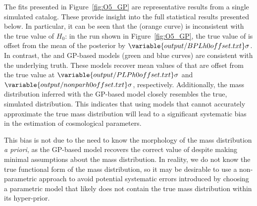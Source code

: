 \documentclass[preprint2,linenumbers]{aastex631}
\begin{document}
The fits presented in Figure~\ref{fig:O5_GP} are representative results from a single simulated catalog.
These provide insight into the full statistical results presented below.
In particular, it can be seen that the \bpl{} (orange curve) is inconsistent with the true value of $H_0$: in the run shown in Figure~\ref{fig:O5_GP}, the true value of \Ho{} is offset from the mean of the posterior by $\variable{output/BPLh0offset.txt}\sigma$.
In contrast, the \plp{} and \ac{GP}-based models (green and blue curves) are consistent with the underlying truth.
These models recover mean values of \Ho{} that are offset from the true value at $\variable{output/PLPh0offset.txt}\sigma$ and $\variable{output/nonparh0offset.txt}\sigma$, respectively. 
Additionally, the mass distribution inferred with the \ac{GP}-based model closely resembles the true, simulated distribution.
This indicates that using models that cannot accurately approximate the true mass distribution will lead to a significant systematic bias in the estimation of cosmological parameters.

This bias is not due to the need to know the morphology of the mass distribution \emph{a priori}, as the \ac{GP}-based model recovers the correct value of \Ho{} despite making minimal assumptions about the mass distribution.
In reality, we do not know the true functional form of the mass distribution, %
so it may be desirable to use a non-parametric approach to avoid potential systematic errors introduced by choosing a parametric model that likely does not contain the true mass distribution within its hyper-prior.
\end{document}
